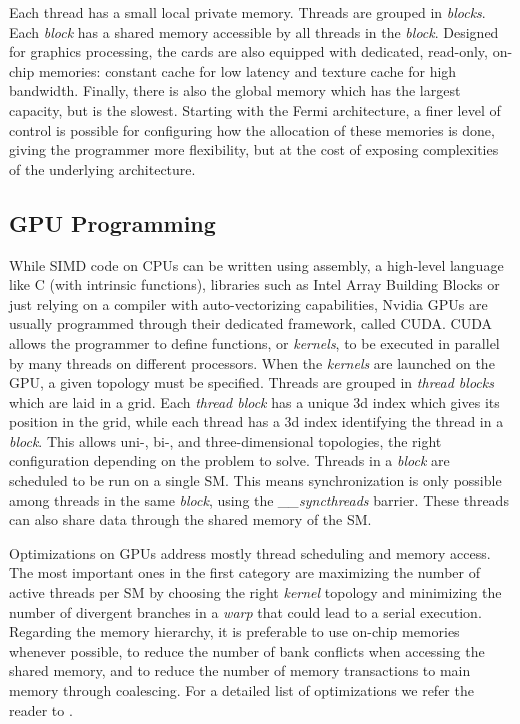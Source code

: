 Each thread has a small local private memory. Threads are grouped in
\textit{blocks}. Each \textit{block} has a shared memory accessible by all
threads in the \textit{block}. Designed for graphics processing, the cards are
also equipped with dedicated, read-only, on-chip memories: constant cache for
low latency and texture cache for high bandwidth. Finally, there is also the
global memory which has the largest capacity, but is the slowest. Starting with
the Fermi architecture, a finer level of control is possible for configuring how
the allocation of these memories is done, giving the programmer more
flexibility, but at the cost of exposing complexities of the underlying
architecture.

\subsection{GPU Programming}

While SIMD code on CPUs can be written using assembly, a high-level language
like C (with intrinsic functions), libraries such as Intel Array Building Blocks
or just relying on a compiler with auto-vectorizing capabilities, Nvidia GPUs
are usually  programmed through their dedicated framework, called CUDA. CUDA
allows the programmer to define functions, or \textit{kernels}, to be executed
in parallel by many threads on different processors. When the \textit{kernels}
are launched on the GPU, a given topology must be specified. Threads are grouped
in \textit{thread blocks} which are laid in a grid. Each \textit{thread block}
has a unique 3d index which gives its position in the grid, while each thread
has a 3d index identifying the thread in a \textit{block}. This allows uni-,
bi-, and three-dimensional topologies, the right configuration depending on the
problem to solve. Threads in a \textit{block} are scheduled to be run on a
single SM. This means synchronization is only possible among threads in the same
\textit{block}, using the \emph{\_\_syncthreads} barrier. These threads can also
share data through the shared memory of the SM.

Optimizations on GPUs address mostly thread scheduling and memory access. The
most important ones in the first category are maximizing the number of active
threads per SM by choosing the right \textit{kernel} topology and minimizing the
number of divergent branches in a \textit{warp} that could lead to a serial
execution. Regarding the memory hierarchy, it is preferable to use on-chip
memories whenever possible, to reduce the number of bank conflicts when
accessing the shared memory, and to reduce the number of memory transactions to
main memory through coalescing. For a detailed list of optimizations we refer
the reader to \cite{cuda}.
